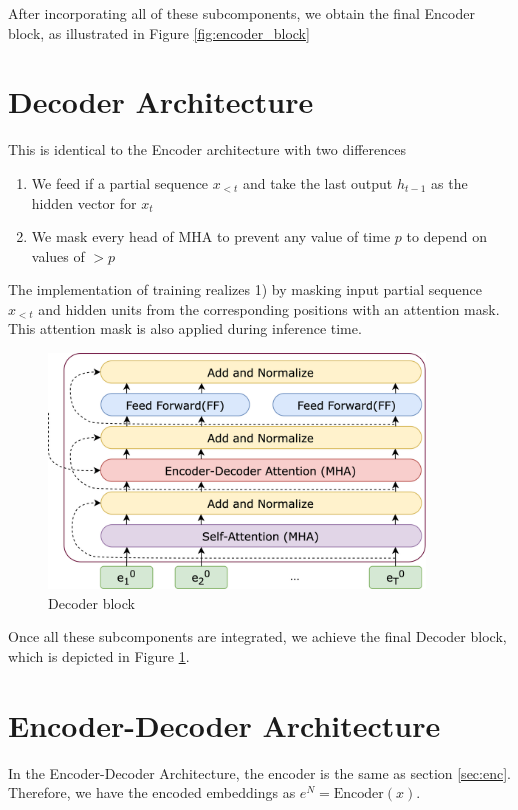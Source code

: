 After incorporating all of these subcomponents, we obtain the final Encoder block, as illustrated in Figure \ref{fig:encoder_block}

\section{Decoder Architecture}\label{sec:dec}

This is identical to the Encoder architecture with two differences

\begin{enumerate}
    \item We feed if a partial sequence $x_{<t}$ and take the last output $h_{t-1}$ as the hidden vector for $x_t$
    \item We mask every head of $\mathrm{MHA}$ to prevent any value of time $p$ to depend on values of $>p$
\end{enumerate}

The implementation of training realizes 1) by masking input partial sequence $x_{<t}$ and hidden units from the corresponding positions with an attention mask. This attention mask is also applied during inference time. 

\begin{figure}[h]
    \centering
    \includegraphics[width=10cm]{pages/imgs/decoder_block.png}
    \caption{Decoder block}
    \label{fig:decoder_block}
\end{figure}

Once all these subcomponents are integrated, we achieve the final Decoder block, which is depicted in Figure \ref{fig:decoder_block}.


\section{Encoder-Decoder Architecture}

In the Encoder-Decoder Architecture, the encoder is the same as section \ref{sec:enc}. Therefore, we have the encoded embeddings as $e^N = \mathrm{Encoder}(x)$.

